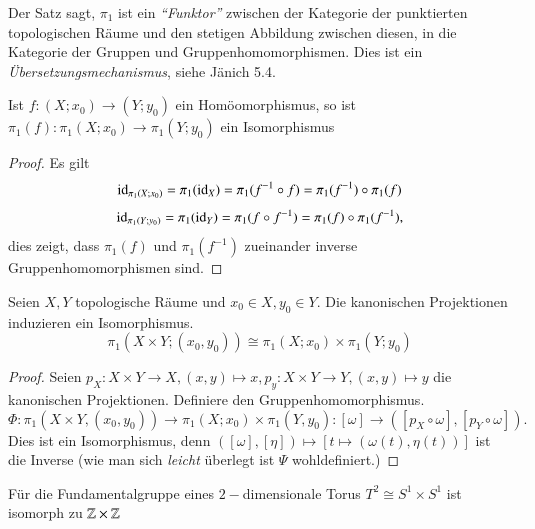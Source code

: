 \documentclass[a4paper,10pt]{scrartcl}
\newcommand{\homo}{\cong}
\begin{document}
\begin{note*}
 Der Satz sagt, $\pi_1$ ist ein \emph{"`Funktor"'} zwischen der Kategorie der punktierten topologischen Räume und den stetigen Abbildung zwischen diesen, in die Kategorie der Gruppen und Gruppenhomomorphismen. Dies ist ein \emph{Übersetzungsmechanismus}, siehe Jänich 5.4.
\end{note*}
\begin{kor}
 Ist $f:(X; x_0)\to (Y; y_0)$ ein Homöomorphismus, so ist $\pi_1(f):\pi_1(X;x_0) \to \pi_1(Y;y_0)$ ein Isomorphismus
\end{kor}
\begin{proof}
 Es gilt 
\[
\operatorname{id}_{\pi_1(X; x_0)}= \pi_1(\operatorname{id}_X)=\pi_1(f^{-1}\circ f)=\pi_1(f^{-1})\circ \pi_1(f)
\]
\[
 \operatorname{id}_{\pi_1(Y;y_0)}=\pi_1(\operatorname{id}_Y)=\pi_1(f\circ f^{-1})=\pi_1(f) \circ \pi_1(f^{-1}),
\]
dies zeigt, dass $\pi_1(f)$ und $\pi_1(f^{-1})$ zueinander inverse Gruppenhomomorphismen sind.
\end{proof}
\begin{st}
 Seien $X,Y$ topologische Räume und $x_0\in X, y_0\in Y$. Die kanonischen Projektionen induzieren ein Isomorphismus.
\[
 \pi_1(X\times Y; (x_0, y_0)) \homo \pi_1(X;x_0) \times \pi_1(Y; y_0)
\]
\end{st}
\begin{proof}
 Seien $p_X: X\times Y \to X, (x,y) \mapsto x, p_y: X\times Y \to Y, (x,y) \mapsto y$ die kanonischen Projektionen. Definiere den Gruppenhomomorphismus.
\[
 \Phi: \pi_1(X\times Y, (x_0, y_0)) \to \pi_1(X;x_0)\times \pi_1(Y,y_0): [\omega] \to ([p_X\circ \omega], [p_Y \circ \omega]).
\]
Dies ist ein Isomorphismus, denn $([\omega],[\eta])\mapsto [t\mapsto (\omega(t), \eta(t))]$ ist die Inverse (wie man sich \emph{leicht} überlegt ist $\Psi$ wohldefiniert.)
\end{proof}
\begin{kor}
 Für die Fundamentalgruppe eines $2-$dimensionale Torus $T^2 \homo S^1 \times S^1$ ist isomorph zu $\mathbb{Z}\times \mathbb{Z}$


\end{kor}
\end{document}
